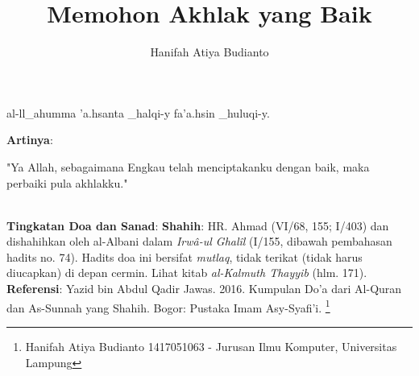 \documentclass[a4paper,12pt]{article}
\title{\Large Memohon Akhlak yang Baik}
\author{\calligra Hanifah Atiya Budianto}
\begin{document}
\sffamily
\maketitle 
\fullvocalize
{}
\begin{arabtext}
\noindent
al-ll_ahumma 'a.hsanta _halqi-y fa'a.hsin _huluqi-y.\\
\end{arabtext}
\noindent
\textbf{Artinya}:
\par
\indent
"Ya Allah, sebagaimana Engkau  telah menciptakanku dengan baik, maka 
perbaiki pula akhlakku."\\\\
\par
\noindent
\textbf{Tingkatan Doa dan Sanad}: \textbf{Shahih}: HR. Ahmad (VI/68, 155; 
I/403) dan dishahihkan oleh al-Albani dalam \textit{Irw\^{a}-ul Ghal\^{i}l} 
(I/155, dibawah pembahasan hadits no. 74). Hadits doa ini bersifat 
\textit{mutlaq}, tidak terikat (tidak harus diucapkan) di depan cermin. 
Lihat kitab \textit{al-Kalmuth Thayyib} (hlm. 171).\\
\textbf{Referensi}: Yazid bin Abdul Qadir Jawas. 2016. Kumpulan Do'a dari
Al-Quran dan As-Sunnah yang Shahih. Bogor: Pustaka Imam Asy-Syafi'i.
\footnote{Hanifah Atiya Budianto 1417051063 - Jurusan Ilmu Komputer,
Universitas Lampung}
\end{document}
